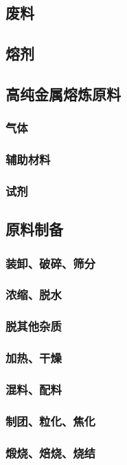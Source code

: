 \documentclass[UTF8]{../../ApplicationUniverse}
\begin{document}
    \subsection{废料}
    \subsection{熔剂}
    \subsection{高纯金属熔炼原料}
        \subsubsection{气体}
        \subsubsection{辅助材料}
        \subsubsection{试剂}
    \subsection{原料制备}
        \subsubsection{装卸、破碎、筛分}
        \subsubsection{浓缩、脱水}
        \subsubsection{脱其他杂质}
        \subsubsection{加热、干燥}
        \subsubsection{混料、配料}
        \subsubsection{制团、粒化、焦化}
        \subsubsection{煅烧、焙烧、烧结}
\end{document}

